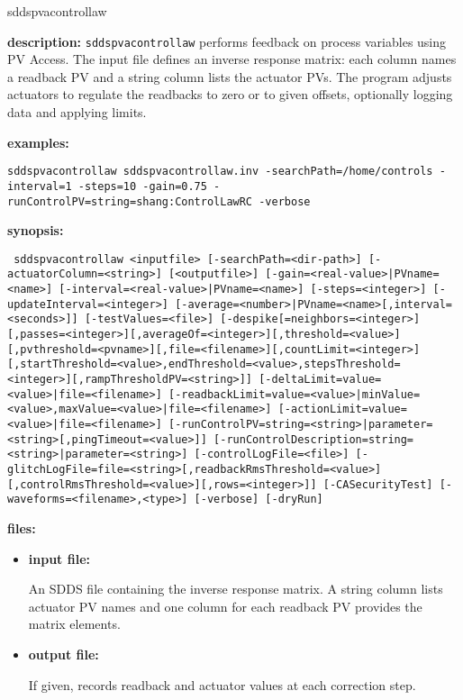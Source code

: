 %
\begin{sddsprog}{sddspvacontrollaw}
\item \textbf{description:}
\verb+sddspvacontrollaw+ performs feedback on process variables using PV Access. The
input file defines an inverse response matrix: each column names a readback PV and a
string column lists the actuator PVs. The program adjusts actuators to regulate the
readbacks to zero or to given offsets, optionally logging data and applying limits.

\item \textbf{examples:}
\begin{flushleft}{\tt sddspvacontrollaw sddspvacontrollaw.inv -searchPath=/home/controls -interval=1 -steps=10 -gain=0.75 -runControlPV=string=shang:ControlLawRC -verbose}\end{flushleft}

\item \textbf{synopsis:}
\begin{flushleft}{\tt
sddspvacontrollaw <inputfile> [-searchPath=<dir-path>] [-actuatorColumn=<string>] [<outputfile>]\
[-gain={<real-value>|PVname=<name>}] [-interval={<real-value>|PVname=<name>}] [-steps=<integer>]\
[-updateInterval=<integer>] [-average={<number>|PVname=<name>}[,interval=<seconds>]]\
[-testValues=<file>]\
[-despike[=neighbors=<integer>][,passes=<integer>][,averageOf=<integer>][,threshold=<value>][,pvthreshold=<pvname>][,file=<filename>][,countLimit=<integer>][,startThreshold=<value>,endThreshold=<value>,stepsThreshold=<integer>][,rampThresholdPV=<string>]]\
[-deltaLimit={value=<value>|file=<filename>}]\
[-readbackLimit={value=<value>|minValue=<value>,maxValue=<value>|file=<filename>}]\
[-actionLimit={value=<value>|file=<filename>}]\
[-runControlPV={string=<string>|parameter=<string>}[,pingTimeout=<value>]]\
[-runControlDescription={string=<string>|parameter=<string>}] [-controlLogFile=<file>]\
[-glitchLogFile=file=<string>[,readbackRmsThreshold=<value>][,controlRmsThreshold=<value>][,rows=<integer>]]\
[-CASecurityTest] [-waveforms=<filename>,<type>] [-verbose] [-dryRun]}
\end{flushleft}

\item \textbf{files:}
\begin{itemize}
  \item \textbf{input file:} \par
    An SDDS file containing the inverse response matrix. A string column lists actuator PV names and one column for each readback PV provides the matrix elements.
  \item \textbf{output file:} \par
    If given, records readback and actuator values at each correction step.
\end{itemize}


\end{sddsprog}
